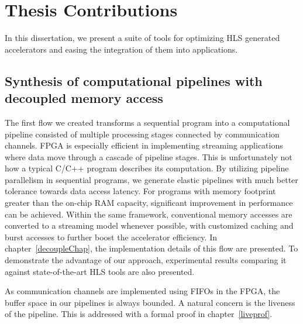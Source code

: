 


\section{Thesis Contributions}
In this dissertation, we present a suite of tools for optimizing HLS generated accelerators and easing the integration
of them into applications. 

\subsection{Synthesis of computational pipelines with decoupled memory access}

The first flow we created transforms a sequential program into a computational pipeline consisted of multiple
processing stages connected by communication channels. FPGA is especially efficient in implementing streaming 
applications where data move through a cascade of pipeline stages. This is unfortunately not how a typical 
C/C++ program describes its computation. By utilizing pipeline parallelism in sequential programs, 
we generate elastic pipelines with much better tolerance towards data access latency.
For programs with memory footprint greater than the on-chip RAM capacity, significant improvement in performance
can be achieved. Within the same framework, conventional memory accesses are converted to a streaming model whenever
possible, with customized caching and burst accesses to further boost the accelerator efficiency. 
In chapter~\ref{decoupleChap}, the implementation details of this flow are presented. To demonstrate 
the advantage of our approach, experimental results comparing it against state-of-the-art HLS tools
are also presented.


As communication
channels are implemented using FIFOs in the FPGA, the buffer space in our pipelines is always bounded. 
A natural concern is the liveness of the pipeline. This is addressed with a formal proof in chapter~\ref{liveprof}.

